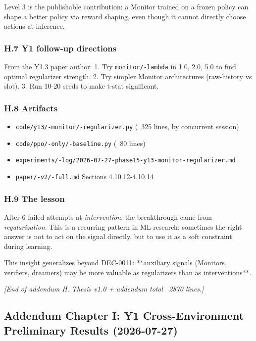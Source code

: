 \documentclass[11pt]{article}
\begin{document}
Level 3 is the publishable contribution: a Monitor trained on a frozen policy
can shape a better policy via reward shaping, even though it cannot directly
choose actions at inference.

\subsubsection{H.7 Y1 follow-up directions}

From the Y1.3 paper author:
1. Try \texttt{monitor/-lambda} in {1.0, 2.0, 5.0} to find optimal regularizer strength.
2. Try simpler Monitor architectures (raw-history vs slot).
3. Run 10-20 seeds to make t-stat significant.

\subsubsection{H.8 Artifacts}

\begin{itemize}
  \item \texttt{code/y13/-monitor/-regularizer.py} (~325 lines, by concurrent session)
  \item \texttt{code/ppo/-only/-baseline.py} (~80 lines)
  \item \texttt{experiments/-log/2026-07-27-phase15-y13-monitor-regularizer.md}
  \item \texttt{paper/-v2/-full.md} Sections 4.10.12-4.10.14
\end{itemize}


\subsubsection{H.9 The lesson}

After 6 failed attempts at \textit{intervention}, the breakthrough came from
\textit{regularization}. This is a recurring pattern in ML research:
sometimes the right answer is not to act on the signal directly, but to
use it as a soft constraint during learning.

This insight generalizes beyond DEC-0011: **auxiliary signals (Monitors,
verifiers, dreamers) may be more valuable as regularizers than as
interventions**.

\hrulefill

\textit{[End of addendum H. Thesis v1.0 + addendum total ~2870 lines.]}


\hrulefill

\subsection{Addendum Chapter I: Y1 Cross-Environment Preliminary Results (2026-07-27)}
\end{document}
